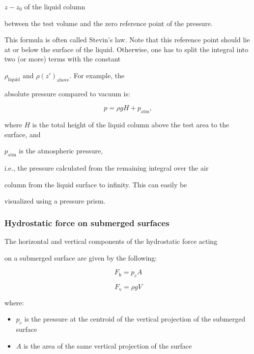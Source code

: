 $z - z_0$ of the liquid column

between the test volume and the zero reference point of the pressure.

This formula is often called Stevin's law. Note that this reference point should lie at or below the surface of the liquid. Otherwise, one has to split the integral into two (or more) terms with the constant

$\rho _\text{liquid}$ and $\rho (z') _\text{above}$. For example, the

absolute pressure compared to vacuum is:


\[
p = \rho g H + p _\mathrm{atm},
\]


where $H$ is the total height of the liquid column above the test area to the surface, and

$p _\text{atm}$ is the atmospheric pressure,

i.e., the pressure calculated from the remaining integral over the air

column from the liquid surface to infinity. This can easily be

visualized using a pressure prism.


\subsubsection{Hydrostatic force on submerged surfaces}
\label{sss:hydr-12b6}


The horizontal and vertical components of the hydrostatic force acting

on a submerged surface are given by the following:


\[
F _\mathrm{h} = p _\mathrm{c}A
\]

\[
F _\mathrm{v} = \rho g V 
\]


where:


\begin{itemize}
    \item $p_c$ is the pressure at the centroid of the vertical projection of the submerged surface
\end{itemize}

\begin{itemize}
    \item $A$ is the area of the same vertical projection of the surface
\end{itemize}

